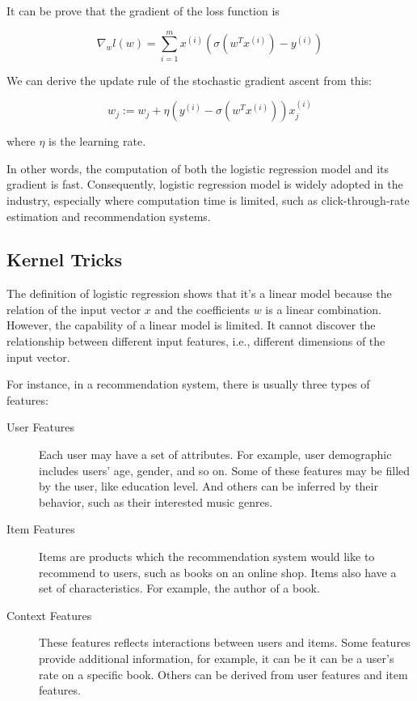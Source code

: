    It can be prove \cite{Ng2000} that the gradient of the loss function is

    \[
    \nabla_w l(w) = \sum_{i=1}^m x^{(i)}\left(\sigma(w^Tx^{(i)}) - y^{(i)}\right)
    \]

    We can derive the update rule of the stochastic gradient ascent from this:

    \[
    w_j := w_j + \eta \left( y^{(i)} - \sigma(w^Tx^{(i)}) \right) x_j^{(i)}
    \]

    where $\eta$ is the learning rate.

    In other words, the computation of both the logistic regression model and its gradient is fast.
    Consequently, logistic regression model is widely adopted in the industry,
    especially where computation time is limited, such as click-through-rate estimation \cite{DBLP:journals/corr/WangZY16}
    and recommendation systems.

    \subsection{Kernel Tricks}

        The definition of logistic regression shows that it's a linear model
        because the relation of the input vector $x$ and the coefficients $w$ is a linear combination.
        However, the capability of a linear model is limited.
        It cannot discover the relationship between different input features,
        i.e., different dimensions of the input vector.

        For instance, in a recommendation system, there is usually three types of features: \cite{Ricci2011}

        \begin{description}
            \item[User Features] Each user may have a set of attributes.
                For example, user demographic includes users' age, gender, and so on.
                Some of these features may be filled by the user, like education level.
                And others can be inferred by their behavior, such as their interested music genres.
            \item[Item Features] Items are products which the recommendation system would like to recommend to users,
                such as books on an online shop.
                Items also have a set of characteristics.
                For example, the author of a book.
            \item[Context Features] These features reflects interactions between users and items.
                Some features provide additional information,
                for example, it can be it can be a user's rate on a specific book.
                Others can be derived from user features and item features.
        \end{description}

